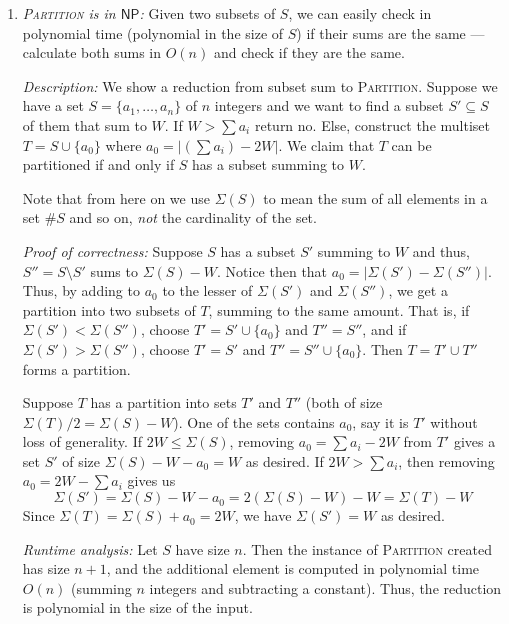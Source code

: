\documentclass[12 pt, letterpaper]{hmcpset}
\begin{document}
\begin{solution}
	\begin{enumerate}
		\item \emph{\textsc{Partition} is in $\mathsf{NP}$:} Given two subsets of $S$, we can easily check in polynomial time (polynomial in the size of $S$) if their sums are the same --- calculate both sums in $O(n)$ and check if they are the same.

			\emph{Description:} We show a reduction from subset sum to \textsc{Partition}. Suppose we have a set $S = \{ a_{1}, \dots, a_{n} \}$ of $n$ integers and we want to find a subset $S' \subseteq S$ of them that sum to $W$. If $W > \sum a_{i}$ return no. Else, construct the multiset $T = S \cup \{ a_{0} \}$ where $a_{0} = \lvert (\sum a_{i}) - 2 W \rvert$. We claim that $T$ can be partitioned if and only if $S$ has a subset summing to $W$.

			Note that from here on we use $\Sigma(S)$ to mean the sum of all elements in a set $\#S$ and so on, \emph{not} the cardinality of the set.

			\emph{Proof of correctness:} Suppose $S$ has a subset $S'$ summing to $W$ and thus, $S'' = S \setminus S'$ sums to $\Sigma(S) - W$. Notice then that $a_{0} = \lvert \Sigma(S') - \Sigma(S'') \rvert$. Thus, by adding to $a_{0}$ to the lesser of $\Sigma(S')$ and $\Sigma(S'')$, we get a partition into two subsets of $T$, summing to the same amount. That is, if $\Sigma(S') < \Sigma(S'')$, choose $T' = S' \cup \{ a_{0} \}$ and $T'' = S''$, and if  $\Sigma(S') > \Sigma(S'')$, choose $T' = S'$ and $T'' = S'' \cup \{ a_{0} \}$. Then $T = T' \cup T''$ forms a partition.

			Suppose $T$ has a partition into sets $T'$ and $T''$ (both of size $\Sigma(T) / 2 = \Sigma(S) - W$). One of the sets contains $a_{0}$, say it is $T'$ without loss of generality. If $2W \le \Sigma(S)$, removing $a_{0} = \sum a_{i} - 2W$ from $T'$ gives a set $S'$ of size $\Sigma(S) - W - a_{0} = W$ as desired. If $2 W > \sum a_{i}$, then removing $a_{0} = 2W - \sum a_{i}$ gives us
			\[
				\Sigma(S') = \Sigma(S) - W - a_{0} = 2(\Sigma(S) - W) - W = \Sigma(T) - W
			\]
			Since $\Sigma(T) = \Sigma(S) + a_{0} = 2W$, we have $\Sigma(S') = W$ as desired.

			\emph{Runtime analysis:} Let $S$ have size $n$. Then the instance of \textsc{Partition} created has size $n + 1$, and the additional element is computed in polynomial time $O(n)$ (summing $n$ integers and subtracting a constant). Thus, the reduction is polynomial in the size of the input.


\end{enumerate}
\end{solution}
\end{document}
